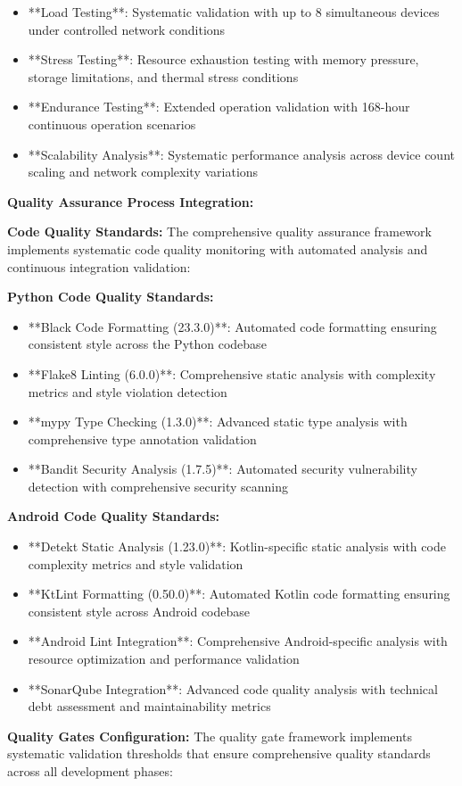 \documentclass[11pt,a4paper]{report}
\begin{document}
\begin{itemize}
\item **Load Testing**: Systematic validation with up to 8 simultaneous devices under controlled network conditions
\item **Stress Testing**: Resource exhaustion testing with memory pressure, storage limitations, and thermal stress
  conditions
\item **Endurance Testing**: Extended operation validation with 168-hour continuous operation scenarios
\item **Scalability Analysis**: Systematic performance analysis across device count scaling and network complexity
  variations

\end{itemize}
\textbf{Quality Assurance Process Integration:}

\textbf{Code Quality Standards:}
The comprehensive quality assurance framework implements systematic code quality monitoring with automated analysis and
continuous integration validation:

\textbf{Python Code Quality Standards:}

\begin{itemize}
\item **Black Code Formatting (23.3.0)**: Automated code formatting ensuring consistent style across the Python codebase
\item **Flake8 Linting (6.0.0)**: Comprehensive static analysis with complexity metrics and style violation detection
\item **mypy Type Checking (1.3.0)**: Advanced static type analysis with comprehensive type annotation validation
\item **Bandit Security Analysis (1.7.5)**: Automated security vulnerability detection with comprehensive security scanning

\end{itemize}
\textbf{Android Code Quality Standards:}

\begin{itemize}
\item **Detekt Static Analysis (1.23.0)**: Kotlin-specific static analysis with code complexity metrics and style validation
\item **KtLint Formatting (0.50.0)**: Automated Kotlin code formatting ensuring consistent style across Android codebase
\item **Android Lint Integration**: Comprehensive Android-specific analysis with resource optimization and performance
  validation
\item **SonarQube Integration**: Advanced code quality analysis with technical debt assessment and maintainability metrics

\end{itemize}
\textbf{Quality Gates Configuration:}
The quality gate framework implements systematic validation thresholds that ensure comprehensive quality standards
across all development phases:
\end{document}
